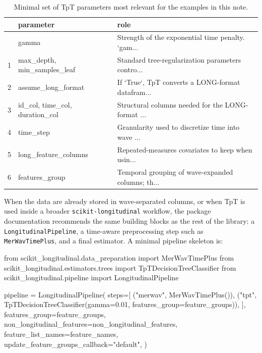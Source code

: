 \documentclass[
  letterpaper,
  DIV=11,
  numbers=noendperiod]{scrartcl}
\newenvironment{Shaded}{\begin{snugshade}}{\end{snugshade}}
\newcommand{\FloatTok}[1]{\textcolor[rgb]{0.68,0.00,0.00}{#1}}
\newcommand{\ImportTok}[1]{\textcolor[rgb]{0.00,0.46,0.62}{#1}}
\newcommand{\NormalTok}[1]{\textcolor[rgb]{0.00,0.23,0.31}{#1}}
\newcommand{\OperatorTok}[1]{\textcolor[rgb]{0.37,0.37,0.37}{#1}}
\newcommand{\StringTok}[1]{\textcolor[rgb]{0.13,0.47,0.30}{#1}}
\begin{document}
\begin{longtable}[]{@{}lll@{}}

\caption{\label{tbl-tpt-main-parameters}Minimal set of TpT parameters
most relevant for the examples in this note.}

\tabularnewline

\toprule\noalign{}
& parameter & role \\
\midrule\noalign{}
\endhead
\bottomrule\noalign{}
\endlastfoot
0 & gamma & Strength of the exponential time penalty. `gam... \\
1 & max\_depth, min\_samples\_leaf & Standard tree-regularization
parameters contro... \\
2 & assume\_long\_format & If `True`, TpT converts a LONG-format
datafram... \\
3 & id\_col, time\_col, duration\_col & Structural columns needed for
the LONG-format ... \\
4 & time\_step & Granularity used to discretize time into wave ... \\
5 & long\_feature\_columns & Repeated-measures covariates to keep when
usin... \\
6 & features\_group & Temporal grouping of wave-expanded columns;
th... \\

\end{longtable}

When the data are already stored in wave-separated columns, or when TpT
is used inside a broader \texttt{scikit-longitudinal} workflow, the
package documentation recommends the same building blocks as the rest of
the library: a \texttt{LongitudinalPipeline}, a time-aware preprocessing
step such as \texttt{MerWavTimePlus}, and a final estimator. A minimal
pipeline skeleton is:

\begin{Shaded}
\begin{Highlighting}[]
\ImportTok{from}\NormalTok{ scikit\_longitudinal.data\_preparation }\ImportTok{import}\NormalTok{ MerWavTimePlus}
\ImportTok{from}\NormalTok{ scikit\_longitudinal.estimators.trees }\ImportTok{import}\NormalTok{ TpTDecisionTreeClassifier}
\ImportTok{from}\NormalTok{ scikit\_longitudinal.pipeline }\ImportTok{import}\NormalTok{ LongitudinalPipeline}

\NormalTok{pipeline }\OperatorTok{=}\NormalTok{ LongitudinalPipeline(}
\NormalTok{    steps}\OperatorTok{=}\NormalTok{[}
\NormalTok{        (}\StringTok{"merwav"}\NormalTok{, MerWavTimePlus()),}
\NormalTok{        (}\StringTok{"tpt"}\NormalTok{, TpTDecisionTreeClassifier(gamma}\OperatorTok{=}\FloatTok{0.01}\NormalTok{, features\_group}\OperatorTok{=}\NormalTok{feature\_groups)),}
\NormalTok{    ],}
\NormalTok{    features\_group}\OperatorTok{=}\NormalTok{feature\_groups,}
\NormalTok{    non\_longitudinal\_features}\OperatorTok{=}\NormalTok{non\_longitudinal\_features,}
\NormalTok{    feature\_list\_names}\OperatorTok{=}\NormalTok{feature\_names,}
\NormalTok{    update\_feature\_groups\_callback}\OperatorTok{=}\StringTok{"default"}\NormalTok{,}
\NormalTok{)}
\end{Highlighting}
\end{Shaded}
\end{document}
